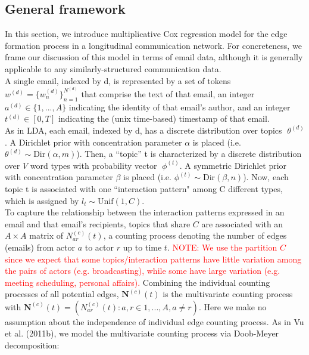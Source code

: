 \documentclass[a4paper]{article}
\begin{document}
\subsection{General framework}
In this section, we introduce multiplicative Cox regression model for the edge formation process in a longitudinal communication network. For concreteness, we frame our discussion of this model in terms of email data, although it is generally applicable to any similarly-structured communication data.\\ \newline A single email, indexed by d, is represented by a set of tokens $w^{(d)} = \{w^{(d)}_n \}_{n=1}^{N^{(d)}}$ that comprise the
text of that email, an integer $a^{(d)} \in \{1,...,A\}$ indicating the identity of that email’s author, and an integer $t^{(d)} \in [0, T]$ indicating the (unix time-based) timestamp of that email. \\ \newline
As in LDA, each email, indexed by d, has a discrete distribution over topics $\theta^{(d)}$. A Dirichlet prior
with concentration parameter $\alpha$ is placed (i.e. $\theta^{(d)}\sim \mbox{Dir}(\alpha, m)$). Then, a “topic” t is characterized by a discrete distribution over $V$ word types with probability vector $\phi^{(t)}$. A symmetric Dirichlet prior with concentration parameter $\beta$ is placed (i.e. $\phi^{(t)} \sim \mbox{Dir}(\beta, n)$). Now, each topic t is associated with one ``interaction pattern" among C different types, which is assigned by $l_t \sim \mbox{Unif}(1, C)$. \\ \newline
To capture the relationship between the interaction patterns expressed in an email and that email’s recipients, topics that share $C$ are associated with an $A\times A$ matrix of $N^{(c)}_{ar}(t)$, a counting process denoting the number of edges (emails) from actor $a$ to actor $r$ up to time $t$. \textcolor{red}{NOTE: We use the partition $C$ since we expect that some topics/interaction patterns have little variation among the pairs of actors (e.g. broadcasting), while some have large variation (e.g. meeting scheduling, personal affairs).} Combining the individual counting processes of all potential edges,  $\mathbf{N}^{(c)}(t)$ is the multivariate counting process with $\mathbf{N}^{(c)}(t)=(N^{(c)}_{ar}(t): a, r \in {1, ..., A}, a \neq r)$. Here we make no assumption about the independence of individual edge counting process. As in Vu et al. (2011b), we model the multivariate counting process via Doob-Meyer decomposition:
\end{document}
